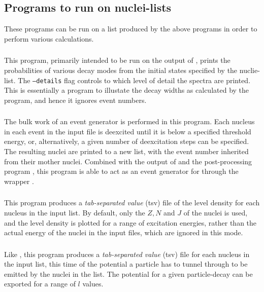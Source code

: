 \subsection{Programs to run on nuclei-lists}
These programs can be run on a list produced by the above programs in order to perform various calculations. 

\subsubsection{}
This program, primarily intended to be run on the output of , prints the probabilities of various decay modes from the initial states specified by the nuclie-list. The \texttt{--details} flag controls to which level of detail the spectra are printed. This is essentially a program to illustate the decay widths as calculated by the program, and hence it ignores event numbers.

\subsubsection{}
The bulk work of an event generator is performed in this program. Each nucleus in each event in the input file is deexcited until it is below a specified threshold energy, or, alternatively, a given number of deexcitation steps can be specified. The resulting nuclei are printed to a new list, with the event number inherited from their mother nuclei. Combined with the output of  and the post-processing program , this program is able to act as an event generator for  through the wrapper .

\subsubsection{}
This program produces a \emph{tab-separated value} (tsv) file of the level density for each nucleus in the input list. By default, only the $Z, N$ and $J$ of the nuclei is used, and the level density is plotted for a range of excitation energies, rather than the actual energy of the nuclei in the input files, which are ignored in this mode.

\subsubsection{}
Like , this program produces a \emph{tab-separated value} (tsv) file for each nucleus in the input list, this time of the potential a particle has to tunnel through to be emitted by the nuclei in the list. The potential for a given particle-decay can be exported for a range of $l$ values.

